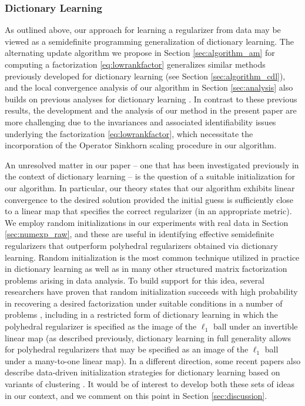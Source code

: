 \documentclass[11pt,letterpaper]{article}
\begin{document}
\subsubsection{Dictionary Learning} \label{sec:relatedwork_dictionarylearning}
As outlined above, our approach for learning a regularizer from data may be viewed as a semidefinite programming generalization of dictionary learning.  The alternating update algorithm we propose in Section \ref{sec:algorithm_am} for computing a factorization \eqref{eq:lowrankfactor} generalizes similar methods previously developed for dictionary learning \cite{AAJN:16,AEB:06,AGTM:15,OlsFie:96} (see Section \ref{sec:algorithm_cdl}), and the local convergence analysis of our algorithm in Section \ref{sec:analysis} also builds on previous analyses for dictionary learning \cite{AAJN:16,AGTM:15}.  In contrast to these previous results, the development and the analysis of our method in the present paper are more challenging due to the invariances and associated identifiability issues underlying the factorization \eqref{eq:lowrankfactor}, which necessitate the incorporation of the Operator Sinkhorn scaling procedure in our algorithm.

An unresolved matter in our paper -- one that has been investigated previously in the context of dictionary learning -- is the question of a suitable initialization for our algorithm.  In particular, our theory states that our algorithm exhibits linear convergence to the desired solution provided the initial guess is sufficiently close to a linear map that specifies the correct regularizer (in an appropriate metric).  We employ random initializations in our experiments with real data in Section \ref{sec:numexp_raw}, and these are useful in identifying effective semidefinite regularizers that outperform polyhedral regularizers obtained via dictionary learning.  Random initialization is the most common technique utilized in practice in dictionary learning as well as in many other structured matrix factorization problems arising in data analysis.  To build support for this idea, several researchers have proven that random initialization succeeds with high probability in recovering a desired factorization under suitable conditions in a number of problems \cite{GLM:16,SWQ:16c}, including in a restricted form of dictionary learning \cite{SQW:16a,SQW:16b} in which the polyhedral regularizer is specified as the image of the $\ell_1$ ball under an invertible linear map (as described previously, dictionary learning in full generality allows for polyhedral regularizers that may be specified as an image of the $\ell_1$ ball under a many-to-one linear map).  In a different direction, some recent papers also describe data-driven initialization strategies for dictionary learning based on variants of clustering \cite{AAN:17,AGM:14}.  It would be of interest to develop both these sets of ideas in our context, and we comment on this point in Section \ref{sec:discussion}.
\end{document}
